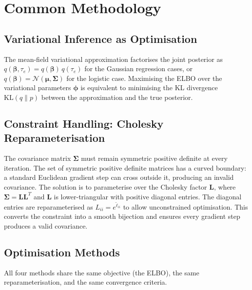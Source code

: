 \documentclass[11pt,a4paper]{article}
\newcommand{\N}{\mathcal{N}}
\begin{document}
\section{Common Methodology}
\label{sec:methodology}

\subsection{Variational Inference as Optimisation}

The mean-field variational approximation factorises the joint posterior as
$q(\bm{\beta}, \tau_e) = q(\bm{\beta})\,q(\tau_e)$ for the Gaussian regression cases,
or $q(\bm{\beta}) = \N(\bm{\mu}, \bm{\Sigma})$ for the logistic case.
Maximising the ELBO over the variational parameters $\bm{\phi}$ is equivalent to
minimising the KL divergence $\mathrm{KL}(q\|p)$ between the approximation and the
true posterior.

\subsection{Constraint Handling: Cholesky Reparameterisation}

The covariance matrix $\bm{\Sigma}$ must remain symmetric positive definite at every
iteration.
The set of symmetric positive definite matrices has a curved boundary: a standard
Euclidean gradient step can cross outside it, producing an invalid covariance.
The solution is to parameterise over the Cholesky factor $\bm{L}$, where
$\bm{\Sigma} = \bm{L}\bm{L}^T$ and $\bm{L}$ is lower-triangular with positive diagonal
entries.
The diagonal entries are reparameterised as $L_{ii} = e^{\tilde{\ell}_{ii}}$ to allow
unconstrained optimisation.
This converts the constraint into a smooth bijection and ensures every gradient step
produces a valid covariance.

\subsection{Optimisation Methods}

All four methods share the same objective (the ELBO), the same reparameterisation,
and the same convergence criteria.
\end{document}
